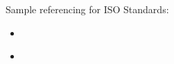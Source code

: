 \begin{comment}
    [1] http://www.telegraph.co.uk/news/2017/01/13/largest-nhs-trust-hit-cyber-attack/
    [2] Cyber criminals target NHS to steal medical data for ransom
    https://www.ft.com/content/b9abf11e-e945-11e6-967b-c88452263daf
    [3] Ransomware brutes smacked 1 in 3 NHS trusts last year
    https://www.theregister.co.uk/2017/01/17/nhs_ransomware/
    [4] Companies Are Stockpiling Bitcoin to Pay O Cybercriminals
    https://www.technologyreview.com/s/601643/
    companies-are-stockpiling-bitcoin-to-pay-off-cybercriminals/
    [5] City banks plan to hoard bitcoins to help them pay cyber ransoms
    https://www.theguardian.com/technology/2016/oct/22/
    city-banks-plan-to-hoard-bitcoins-to-help-them-pay-cyber-ransoms
    [6] With the looming threat of Ransomware, should companies stockpile Bitcoins?
    https://www.bleepingcomputer.com/editorial/security/
    with-the-looming-threat-of-ransomware-should-companies-stockpile-bitcoins/
    [7] Hackers who infected 200,000 machines have only made \$50,000 worth of bitcoin http://www.cnbc.
    com/2017/05/15/wannacry-ransomware-hackers-have-only-made-50000-worth-of-bitcoin.html
    [8] WannaCry payment https://www.elliptic.co/wannacry/
    [9]http://wannacry.today/

    
\end{comment}

Sample referencing for ISO Standards:
\begin{itemize}
    \item \cite{ISO27001:2013}
    \item \citep{ISO27002:2013}
\end{itemize}

